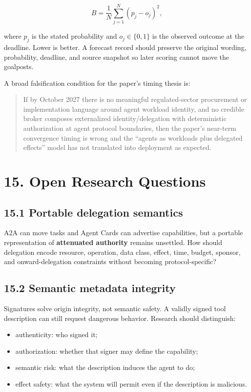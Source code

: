 \documentclass[
  10pt,
  letterpaper,
]{article}
\providecommand{\tightlist}{%
  \setlength{\itemsep}{0pt}\setlength{\parskip}{0pt}}
\begin{document}
\[
B = \frac{1}{N}\sum_{j=1}^{N}(p_j-o_j)^2,
\]

where \(p_j\) is the stated probability and \(o_j\in\{0,1\}\) is the
observed outcome at the deadline. Lower is better. A forecast record
should preserve the original wording, probability, deadline, and source
snapshot so later scoring cannot move the goalposts.

A broad falsification condition for the paper's timing thesis is:

\begin{quote}
If by October 2027 there is no meaningful regulated-sector procurement
or implementation language around agent workload identity, and no
credible broker composes externalized identity/delegation with
deterministic authorization at agent protocol boundaries, then the
paper's near-term convergence timing is wrong and the ``agents as
workloads plus delegated effects'' model has not translated into
deployment as expected.
\end{quote}

\section{15. Open Research Questions}\label{open-research-questions}

\subsection{15.1 Portable delegation
semantics}\label{portable-delegation-semantics}

A2A can move tasks and Agent Cards can advertise capabilities, but a
portable representation of \textbf{attenuated authority} remains
unsettled. How should delegation encode resource, operation, data class,
effect, time, budget, sponsor, and onward-delegation constraints without
becoming protocol-specific?

\subsection{15.2 Semantic metadata
integrity}\label{semantic-metadata-integrity}

Signatures solve origin integrity, not semantic safety. A validly signed
tool description can still request dangerous behavior. Research should
distinguish:

\begin{itemize}
\tightlist
\item
  authenticity: who signed it;
\item
  authorization: whether that signer may define the capability;
\item
  semantic risk: what the description induces the agent to do;
\item
  effect safety: what the system will permit even if the description is
  malicious.
\end{itemize}
\end{document}
